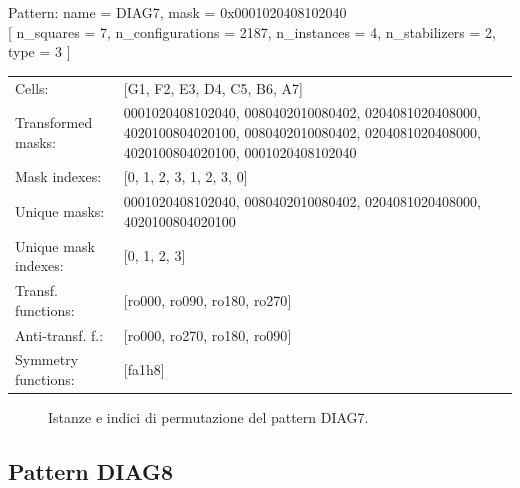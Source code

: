 \begin{tcolorbox}[sharp corners, fontupper=\ttfamily\small, colback=white]
  \noindent Pattern: name = DIAG7, mask = 0x0001020408102040\\
  {[} n\_squares = 7, n\_configurations = 2187,
  n\_instances = 4, n\_stabilizers = 2, type = 3 { ]}\\[1.0ex]
  \begin{tabularx}{\textwidth}{@{} p{3.5cm} X @{}}
    Cells:               & {[}G1, F2, E3, D4, C5, B6, A7{]}\\[0.5ex]
    Transformed masks:   & 0001020408102040, 0080402010080402, 0204081020408000, 4020100804020100, 0080402010080402, 0204081020408000, 4020100804020100, 0001020408102040\\[0.5ex]
    Mask indexes:        & {[}0, 1, 2, 3, 1, 2, 3, 0{]}\\[0.5ex]
    Unique masks:        & 0001020408102040, 0080402010080402, 0204081020408000, 4020100804020100\\[0.5ex]
    Unique mask indexes: & {[}0, 1, 2, 3{]}\\[0.5ex]
    Transf. functions:   & {[}ro000, ro090, ro180, ro270{]}\\[0.5ex]
    Anti-transf. f.:     & {[}ro000, ro270, ro180, ro090{]}\\[0.5ex]
    Symmetry functions:  & {[}fa1h8{]}\\[0.5ex]
  \end{tabularx}
\end{tcolorbox}

\begin{figure}[htbp]
  \centering
   \hfill
   \hfill
   \hfill
  \vspace{0.3cm}
   \hfill
   \hfill
   \hfill
  \caption{Istanze e indici di permutazione del pattern DIAG7.}
\end{figure}

\newpage

\subsection{Pattern DIAG8}

